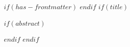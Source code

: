 $if(has-frontmatter)$
\frontmatter
$endif$
$if(title)$
\maketitle
$if(abstract)$
\begin{abstract}
\noindent $abstract$
$if(keywords)$

\medskip\noindent\textbf{Keywords:} $for(keywords)$$keywords$$sep$, $endfor$
$endif$
$for(custom-keywords)$

\noindent\textbf{$it.name$:} $for(it.values)$$it$$sep$, $endfor$
$endfor$
\end{abstract}
$endif$
$endif$
